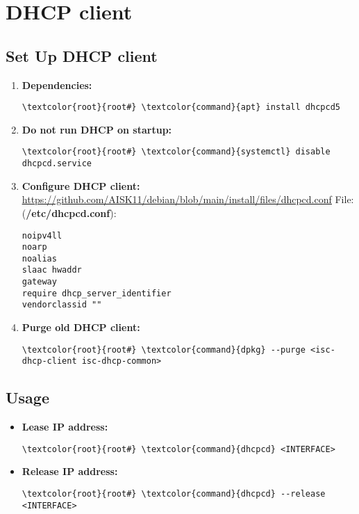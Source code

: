 \documentclass[10pt, a4paper, onecolumn, openany]{book} %
\begin{document}
\section{DHCP client}
\subsection{Set Up DHCP client}
\begin{enumerate}
    \item \textbf{Dependencies:}
\begin{Verbatim}[commandchars=\\\{\}]
\textcolor{root}{root#} \textcolor{command}{apt} install dhcpcd5
\end{Verbatim}
    \item \textbf{Do not run DHCP on startup:}
\begin{Verbatim}[commandchars=\\\{\}]
\textcolor{root}{root#} \textcolor{command}{systemctl} disable dhcpcd.service
\end{Verbatim}
    \item \textbf{Configure DHCP client:}
\newline \underline{\url{https://github.com/AISK11/debian/blob/main/install/files/dhcpcd.conf}}
\newline File: (\textbf{\textcolor{file}{/etc/dhcpcd.conf}}):
\begin{Verbatim}[commandchars=\\\{\}]
noipv4ll
noarp
noalias
slaac hwaddr
gateway
require dhcp_server_identifier
vendorclassid ""
\end{Verbatim}
    \item \textbf{Purge old DHCP client:}
\begin{Verbatim}[commandchars=\\\{\}]
\textcolor{root}{root#} \textcolor{command}{dpkg} --purge <isc-dhcp-client isc-dhcp-common>
\end{Verbatim}
\end{enumerate}
\subsection{Usage}
\begin{itemize}
    \item \textbf{Lease IP address:}
\begin{Verbatim}[commandchars=\\\{\}]
\textcolor{root}{root#} \textcolor{command}{dhcpcd} <INTERFACE>
\end{Verbatim}
    \item \textbf{Release IP address:}
\begin{Verbatim}[commandchars=\\\{\}]
\textcolor{root}{root#} \textcolor{command}{dhcpcd} --release <INTERFACE>
\end{Verbatim}
\end{itemize}
\end{document}
